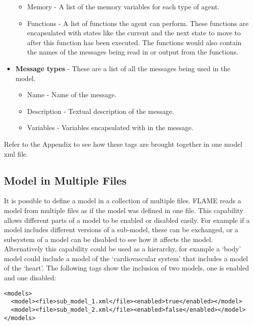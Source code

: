 \begin{itemize}
\begin{itemize}
\item Memory - A list of the memory variables for each type of agent.
\item Functions - A list of functions the agent can perform. These functions are encapsulated with states like the current and the next state to move to after this function has been executed. The functions would also contain the names of the messages being read in or output from the functions.
\end{itemize}
\item \textbf{Message types} - These are a list of all the messages being used in the model.
\begin{itemize}
\item Name - Name of the message.
\item Description - Textual description of the message.
\item Variables - Variables encapsulated with in the message.
\end{itemize}
\end{itemize}

Refer to the Appendix to see how these tags are brought together in one model xml file.

\subsection{Model in Multiple Files}

It is possible to define a model in a collection of multiple files. FLAME reads a model from
multiple files as if the model was defined in one file. This capability allows
different parts of a model to be enabled or disabled easily. For example if a
model includes different versions of a sub-model, these can be exchanged, or a
subsystem of a model can be disabled to see how it affects the model.
Alternatively this capability could be used as a hierarchy, for example a `body'
model could include a model of the `cardiovascular system' that includes a
model of the `heart'. The following tags show the inclusion of two models, one is
enabled and one disabled:

\begin{mylisting}
\begin{verbatim}
<models>
  <model><file>sub_model_1.xml</file><enabled>true</enabled></model>
  <model><file>sub_model_2.xml</file><enabled>false</enabled></model>
</models>
\end{verbatim}
\end{mylisting}


